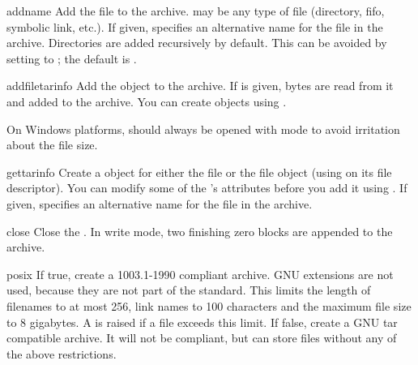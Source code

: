 \begin{methoddesc}{add}{name}
    Add the file  to the archive.  may be any type
    of file (directory, fifo, symbolic link, etc.).
    If given,  specifies an alternative name for the file in the
    archive. Directories are added recursively by default.
    This can be avoided by setting  to ;
    the default is .
\end{methoddesc}

\begin{methoddesc}{addfile}{tarinfo}
    Add the  object  to the archive.
    If  is given,  bytes are read
    from it and added to the archive.  You can create  objects
    using .
    \begin{notice}
    On Windows platforms,  should always be opened with mode
     to avoid irritation about the file size.
    \end{notice}
\end{methoddesc}

\begin{methoddesc}{gettarinfo}{}
    Create a  object for either the file  or
    the file object  (using  on its
    file descriptor).  You can modify some of the 's
    attributes before you add it using .  If given,
     specifies an alternative name for the file in the
    archive.
\end{methoddesc}

\begin{methoddesc}{close}{}
    Close the . In write mode, two finishing zero
    blocks are appended to the archive.
\end{methoddesc}

\begin{memberdesc}{posix}
    If true, create a \POSIX{} 1003.1-1990 compliant archive. GNU
    extensions are not used, because they are not part of the \POSIX{}
    standard.  This limits the length of filenames to at most 256,
    link names to 100 characters and the maximum file size to 8
    gigabytes. A  is raised if a file exceeds
    this limit.  If false, create a GNU tar compatible archive.  It
    will not be \POSIX{} compliant, but can store files without any
    of the above restrictions. 
\end{memberdesc}


